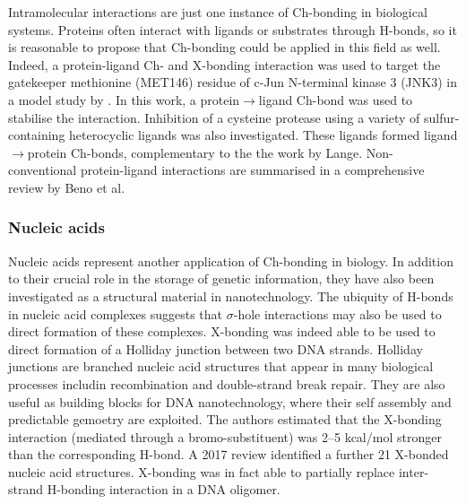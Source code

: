\begin{refsection}
Intramolecular interactions are just one instance of Ch-bonding in biological systems.
Proteins often interact with ligands or substrates through H-bonds, so it is reasonable to propose that Ch-bonding could be applied in this field as well.
Indeed, a protein-ligand Ch- and X-bonding interaction was used to target the gatekeeper methionine (MET146) residue of c-Jun N-terminal kinase 3 (JNK3) in a model study by \citeauthor{Lange2015}.\autocite{Lange2015}
In this work, a protein$\rightarrow$ligand Ch-bond was used to stabilise the interaction.
Inhibition of a cysteine protease using a variety of sulfur-containing heterocyclic ligands was also investigated.\autocite{Giroud2017}
These ligands formed ligand$\rightarrow$protein Ch-bonds, complementary to the the work by Lange.
Non-conventional protein-ligand interactions are summarised in a comprehensive review by Beno et al.\autocite{Beno2015}

\subsubsection{Nucleic acids}
Nucleic acids represent another application of Ch-bonding in biology.
In addition to their crucial role in the storage of genetic information, they have also been investigated as a structural material in nanotechnology.
The ubiquity of H-bonds in nucleic acid complexes suggests that $\sigma$-hole interactions may also be used to direct formation of these complexes.
X-bonding was indeed able to be used to direct formation of a Holliday junction between two DNA strands.\autocite{Voth2007}
Holliday junctions are branched nucleic acid structures that appear in many biological processes includin recombination and double-strand break repair.
They are also useful as building blocks for DNA nanotechnology, where their self assembly and predictable gemoetry are exploited.
The authors estimated that the X-bonding interaction (mediated through a bromo-substituent) was 2--5 kcal/mol stronger than the corresponding H-bond.
A 2017 review identified a further 21 X-bonded nucleic acid structures.\autocite{Kolar2017}
X-bonding was in fact able to partially replace inter-strand H-bonding interaction in a DNA oligomer.\autocite{Parker2012}


\end{refsection}
